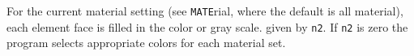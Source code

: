 \headb

For the
current material setting (see {\tt MATE}rial, where the default is
all material), each element face is filled in the color or gray scale.
given by {\tt n2}. If {\tt n2} is
zero the program selects appropriate colors for each material set.
\vfill
\eject
